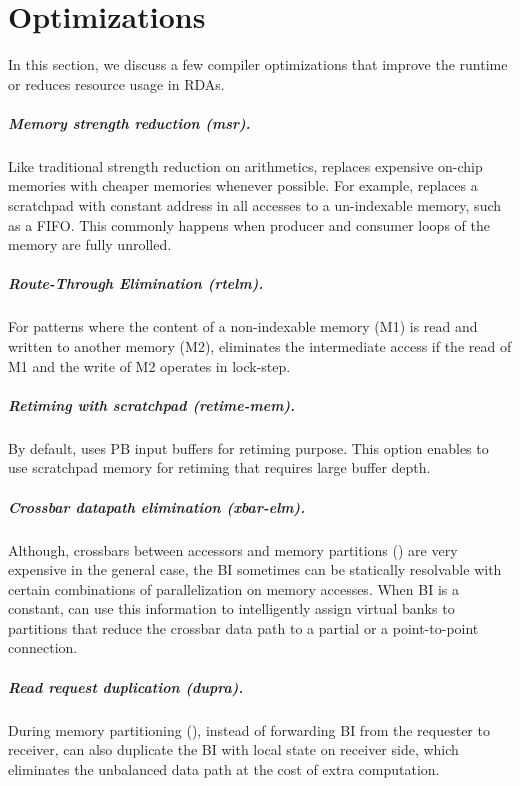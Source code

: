 \section{Optimizations}\label{sec:opt}
In this section, we discuss a few compiler optimizations that improve the runtime or reduces resource usage in RDAs.

\subparagraph{Memory strength reduction (msr).} Like traditional strength reduction on arithmetics, \name{} replaces expensive on-chip memories with cheaper memories whenever possible.
For example, \name{} replaces a scratchpad with constant address in all accesses to a un-indexable memory, such as a FIFO.
This commonly happens when producer and consumer loops of the memory are fully unrolled.

\subparagraph{Route-Through Elimination (rtelm).} For patterns where the content of a non-indexable memory  (M1) is read and written to another memory (M2), \name{} eliminates the intermediate access if the read of M1 and the write of M2 operates in lock-step.

\subparagraph{Retiming with scratchpad (retime-mem).} By default, \name{} uses PB input buffers for retiming purpose. 
This option enables \name{} to use scratchpad memory for retiming that requires large buffer depth.

\subparagraph{Crossbar datapath elimination (xbar-elm).}
Although, crossbars between accessors and memory partitions () are very expensive in the general case, the BI sometimes can be statically resolvable with certain combinations of parallelization on memory accesses. 
When BI is a constant, \name{} can use this information to intelligently assign virtual banks to partitions that reduce the crossbar data path to a partial or a point-to-point connection.

\subparagraph{Read request duplication (dupra).} During memory partitioning (), instead of forwarding BI from the requester to receiver, \name{} can also duplicate the BI with local state on receiver side, which
eliminates the unbalanced data path at the cost of extra computation.

